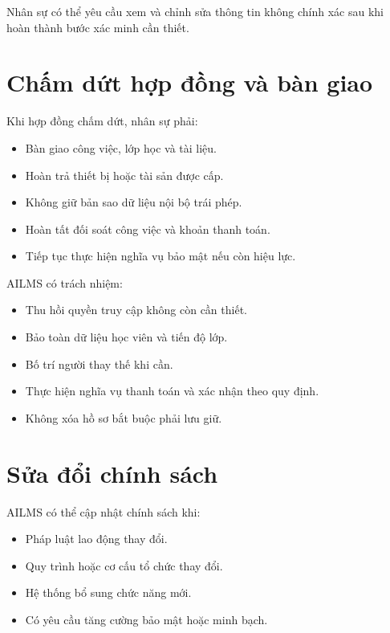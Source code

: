 \documentclass[12pt,a4paper]{article}
\begin{document}
Nhân sự có thể yêu cầu xem và chỉnh sửa thông tin không chính xác
sau khi hoàn thành bước xác minh cần thiết.

\section{Chấm dứt hợp đồng và bàn giao}

Khi hợp đồng chấm dứt, nhân sự phải:

\begin{itemize}
    \item Bàn giao công việc, lớp học và tài liệu.
    \item Hoàn trả thiết bị hoặc tài sản được cấp.
    \item Không giữ bản sao dữ liệu nội bộ trái phép.
    \item Hoàn tất đối soát công việc và khoản thanh toán.
    \item Tiếp tục thực hiện nghĩa vụ bảo mật nếu còn hiệu lực.
\end{itemize}

AILMS có trách nhiệm:

\begin{itemize}
    \item Thu hồi quyền truy cập không còn cần thiết.
    \item Bảo toàn dữ liệu học viên và tiến độ lớp.
    \item Bố trí người thay thế khi cần.
    \item Thực hiện nghĩa vụ thanh toán và xác nhận theo quy định.
    \item Không xóa hồ sơ bắt buộc phải lưu giữ.
\end{itemize}

\section{Sửa đổi chính sách}

AILMS có thể cập nhật chính sách khi:

\begin{itemize}
    \item Pháp luật lao động thay đổi.
    \item Quy trình hoặc cơ cấu tổ chức thay đổi.
    \item Hệ thống bổ sung chức năng mới.
    \item Có yêu cầu tăng cường bảo mật hoặc minh bạch.
\end{itemize}
\end{document}
